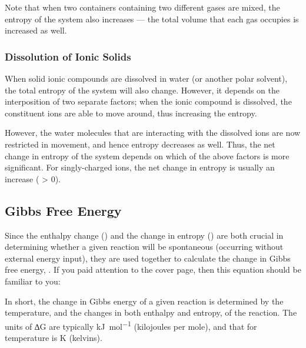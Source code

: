 				Note that when two containers containing two different gases are mixed, the entropy of the system also increases --- the total
				volume that each gas occupies is increased as well.



			\pagebreak
			\subsubsection{Dissolution of Ionic Solids}

				When solid ionic compounds are dissolved in water (or another polar solvent), the total entropy of the system will also change.
				However, it depends on the interposition of two separate factors; when the ionic compound is dissolved, the constituent ions are
				able to move around, thus increasing the entropy.

				However, the water molecules that are interacting with the dissolved ions are now restricted in movement, and hence entropy decreases
				as well. Thus, the net change in entropy of the system depends on which of the above factors is more significant. For singly-charged
				ions, the net change in entropy is usually an increase (\entr{} > 0).




		\subsection{Gibbs Free Energy}

			Since the enthalpy change (\enth{}) and the change in entropy (\entr{}) are both crucial in determining whether a given reaction will
			be spontaneous (occurring without external energy input), they are used together to calculate the change in Gibbs free energy, \gibb{}.
			If you paid attention to the cover page, then this equation should be familiar to you:


			In short, the change in Gibbs energy of a given reaction is determined by the temperature, and the changes in both enthalpy and entropy,
			of the reaction. The units of ∆G are typically \si{\kilo\joule\per\mole} (kilojoules per mole), and that for temperature is \si{\kelvin}
			(kelvins).

